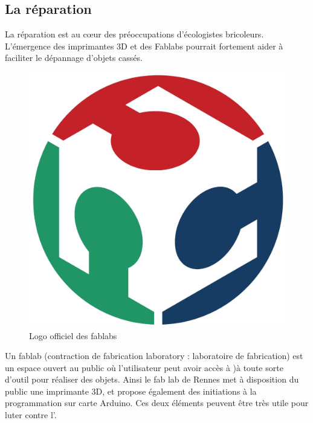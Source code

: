 \subsection{La réparation}
\label{ss::repartation}

La réparation est au cœur des préoccupations d'écologistes bricoleurs. L'émergence des imprimantes 3D et des Fablabs pourrait fortement aider  à faciliter le dépannage d'objets cassés. 

\begin{figure}\begin{center}
\vspace{-0.7cm}\includegraphics[scale=0.33]{Rsc/logofablab.jpg} 

\caption{Logo officiel des fablabs}
\end{center}
\end{figure}

Un fablab (contraction de fabrication laboratory : laboratoire de fabrication) est un espace ouvert au public où l'utilisateur peut avoir accès à )à toute sorte d'outil pour réaliser des objets. Ainsi le fab lab de Rennes met à disposition du public une imprimante 3D, et propose également des initiations à la programmation sur carte Arduino. 
Ces deux éléments peuvent être très utile pour luter contre l'\op. 

